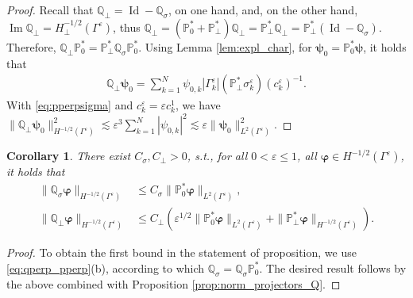 \documentclass[]{article}
\newtheorem{corollary}{Corollary}
\numberwithin{equation}{section}
\numberwithin{theorem}{section}
\numberwithin{lemma}{section}
\numberwithin{corollary}{section}
\numberwithin{proposition}{section}
\numberwithin{definition}{section}
\newcommand{\re}{\varepsilon}
\renewcommand{\vec}{\boldsymbol}
\renewcommand{\Im}{\operatorname{Im}}
\begin{document}
\begin{appendices}
		\begin{proof}
			Recall that $\mathbb{Q}_{\perp}=\operatorname{Id}-\mathbb{Q}_{\sigma}$, on one hand, and, on the other hand, $\Im \mathbb{Q}_{\perp}=H^{-1/2}_{\perp}(\Gamma^{\re})$, thus $
			\mathbb{Q}_{\perp}=(\mathbb{P}_0^*+\mathbb{P}_{\perp}^*)\mathbb{Q}_{\perp}=\mathbb{P}_{\perp}^*\mathbb{Q}_{\perp}=\mathbb{P}_{\perp}^*(\operatorname{Id}-\mathbb{Q}_{\sigma}).$ 
			Therefore, $
			\mathbb{Q}_{\perp}\mathbb{P}_0^*=\mathbb{P}_{\perp}^*\mathbb{Q}_{\sigma}\mathbb{P}_0^*.$ 
			Using Lemma \ref{lem:expl_char}, for $\vec{\psi}_0=\mathbb{P}_0^*\vec{\psi}$, it holds that 
			\begin{align*}
				\mathbb{Q}_{\perp}\vec{\psi}_0=\sum_{k=1}^N \psi_{0,k}|\Gamma_k^{\re}|(\mathbb{P}_{\perp}^*\sigma_k^{\re}) (c_k^{\re})^{-1}.
			\end{align*}
			With \eqref{eq:pperpsigma} and $c_k^{\re}=\re c_k^1$, we have $
			\|	\mathbb{Q}_{\perp}\vec{\psi}_0\|_{H^{-1/2}(\Gamma^{\re})}^2\lesssim \re^{3}\sum\limits_{k=1}^N |\psi_{0,k}|^2\lesssim \re\|\vec{\psi}_0\|_{L^2(\Gamma^{\re})}^2.$
		\end{proof}
		
		\begin{corollary}
			\label{proof:bound_control}
			There exist $C_{\sigma}, C_{\perp}>0$, s.t., for all $0<\re\leq 1$, all  $\vec{\varphi}\in H^{-1/2}(\Gamma^{\re})$, it holds that
			\begin{align*}%
				\|\mathbb{Q}_{\sigma}\boldsymbol{\varphi}\|_{H^{-1/2}(\Gamma^{\re})} &\leq C_{\sigma} \|\mathbb{P}_0^*\boldsymbol{\varphi}\|_{L^2(\Gamma^{\re})} , \\
				\|\mathbb{Q}_{\perp}\boldsymbol{\varphi}\|_{H^{-1/2}(\Gamma^{\re})} &\leq C_{\perp}(\re^{1/2}\|\mathbb{P}_0^*\boldsymbol{\varphi}\|_{L^2(\Gamma^{\re})}+
				\|\mathbb{P}_{\perp}^*\boldsymbol{\varphi}\|_{H^{-1/2}(\Gamma^{\re})}). 
			\end{align*}
		\end{corollary}
		\begin{proof}
			To obtain the first bound in the statement of proposition, we use \eqref{eq:qperp_pperp}(b), according to which  $\mathbb{Q}_{\sigma}=\mathbb{Q}_{\sigma}\mathbb{P}_0^*$. The desired result follows by the above combined with Proposition \ref{prop:norm_projectors_Q}. 
			

\end{proof}
\end{appendices}
\end{document}
